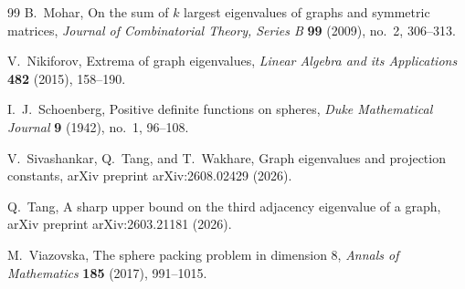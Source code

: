 \documentclass[UTF8,11pt]{ctexart}
\theoremstyle{definition}
\begin{document}
\begin{thebibliography}{99}
B.~Mohar,
\newblock On the sum of $k$ largest eigenvalues of graphs and symmetric matrices,
\newblock \textit{Journal of Combinatorial Theory, Series B} \textbf{99} (2009), no.~2, 306--313.

V.~Nikiforov,
\newblock Extrema of graph eigenvalues,
\newblock \textit{Linear Algebra and its Applications} \textbf{482} (2015), 158--190.

I.~J.~Schoenberg,
\newblock Positive definite functions on spheres,
\newblock \textit{Duke Mathematical Journal} \textbf{9} (1942), no.~1, 96--108.

V.~Sivashankar, Q.~Tang, and T.~Wakhare,
\newblock Graph eigenvalues and projection constants,
\newblock arXiv preprint arXiv:2608.02429 (2026).

Q.~Tang,
\newblock A sharp upper bound on the third adjacency eigenvalue of a graph,
\newblock arXiv preprint arXiv:2603.21181 (2026).

M.~Viazovska,
\newblock The sphere packing problem in dimension 8,
\newblock \textit{Annals of Mathematics} \textbf{185} (2017), 991--1015.

\end{thebibliography}
\end{document}
